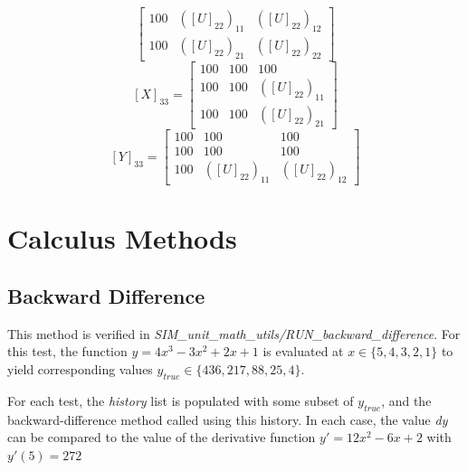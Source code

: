 \documentclass[11pt,fleqn]{report}
\begin{document}
\begin{enumerate}
\[\begin{bmatrix}
            100 & ([U]_{22})_{11} & ([U]_{22})_{12} \\
            100 & ([U]_{22})_{21} & ([U]_{22})_{22}
        \end{bmatrix}
        \]
        \[
        [X]_{33} = 
        \begin{bmatrix}
            100 & 100 & 100 \\
            100 & 100 & ([U]_{22})_{11} \\
            100 & 100 & ([U]_{22})_{21}
        \end{bmatrix}
        \]
        \[
        [Y]_{33} = 
        \begin{bmatrix}
            100 & 100 & 100 \\
            100 & 100 & 100 \\
            100 & ([U]_{22})_{11} & ([U]_{22})_{12}
        \end{bmatrix}
        \]
\end{enumerate}

\section{Calculus Methods}
\subsection{Backward Difference}
This method is verified in
\textit{SIM\_unit\_math\_utils/RUN\_backward\_difference}.
For this test, the function $y = 4x^3 - 3x^2 +2x +1$ is evaluated at $x
\in \{5,4,3,2,1\}$ to yield corresponding values \newline
$y_{true} \in \{436, 217, 88, 25, 4\}$.

For each test, the \textit{history} list is populated with some subset of
$y_{true}$, and the backward-difference method called using this history. In
each case, the value \textit{dy} can be compared to the value of the derivative
function $y' = 12x^2-6x +2$ with $y'(5) = 272$
\end{document}
